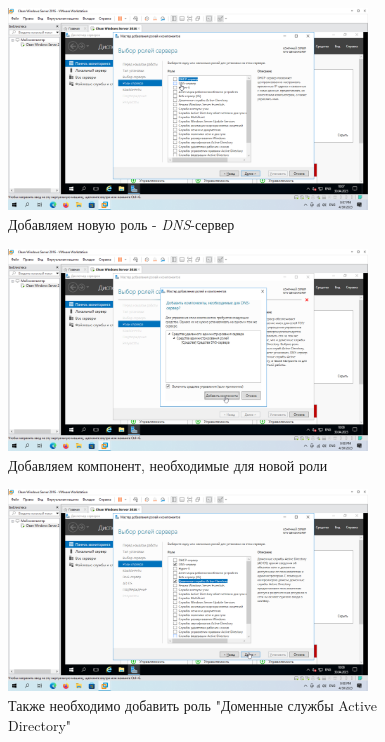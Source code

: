 \documentclass[a4paper]{article}
\begin{document}
  \begin{figure}[H]
    \centering
    \includegraphics[width=0.85\textwidth]{Screenshot_42}
    \caption{Добавляем новую роль - \textit{DNS}-сервер}
    \label{img:42}
  \end{figure}

  \begin{figure}[H]
    \centering
    \includegraphics[width=0.85\textwidth]{Screenshot_43}
    \caption{Добавляем компонент, необходимые для новой роли}
    \label{img:43}
  \end{figure}

  \begin{figure}[H]
    \centering
    \includegraphics[width=0.85\textwidth]{Screenshot_44}
    \caption{Также необходимо добавить роль "Доменные службы Active Directory"}
    \label{img:44}
  \end{figure}
\end{document}
